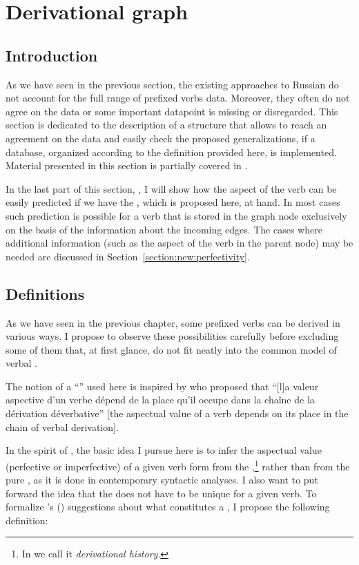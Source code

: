 
\section{Derivational graph}\label{section:graph}
\subsection{Introduction}
As we have seen in the previous section, the existing approaches to Russian  do not account for the full range of prefixed verbs data. Moreover, they often do not agree on the data or some important datapoint is missing or disregarded. This section is dedicated to the description of a structure that allows to reach an agreement on the  data and easily check the proposed generalizations, if a database, organized according to the definition provided here, is implemented. Material presented in this section is partially covered in \citet{ZinovaFilip:14b}.

In the last part of this section, , I will show how the aspect of the verb can be easily predicted if we have the , which is proposed here, at hand. In most cases such prediction is possible for a verb that is stored in the graph node exclusively on the basis of the information about the incoming edges. The cases where additional information (such as the aspect of the verb in the parent node) may be needed are discussed in Section~\ref{section:new:perfectivity}.

\subsection{Definitions}\label{section:chains:definition}
As we have seen in the previous chapter, some prefixed verbs can be derived in various ways. I propose to observe these possibilities carefully before excluding some of them that, at first glance, do not fit neatly into the common model of verbal .

The notion of a ``'' used here is inspired by \citet{Karcevski:27} who proposed that ``[l]a valeur aspective d'un verbe d\'{e}pend de la place qu'il occupe dans la cha\^{i}ne de la d\'{e}rivation d\'{e}verbative'' [the aspectual value of a verb depends on its place in the chain of verbal derivation].

In the spirit of \citet{Karcevski:27}, the basic idea I pursue here is to infer the aspectual value (perfective or imperfective) of a given verb form from the ,\footnote{In \citet{ZinovaFilip:14b} we call it \textit{derivational history}.} rather than from the pure , as it is done in contemporary syntactic analyses. I also want to put forward the idea that the  does not have to be unique for a given verb. To formalize \citeauthor{Karcevski:27}'s (\citeyear{Karcevski:27}) suggestions about what constitutes a , I propose the following definition:

